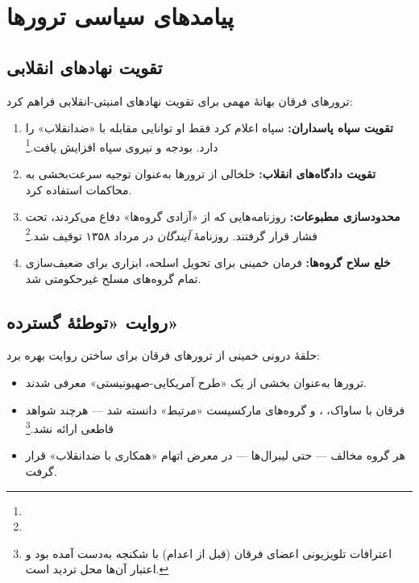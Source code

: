 \section{پیامدهای سیاسی ترورها}

\subsection{تقویت نهادهای انقلابی}

ترورهای فرقان بهانهٔ مهمی برای تقویت نهادهای امنیتی-انقلابی فراهم کرد:

\begin{enumerate}[label=\textcolor{cPrimary}{\bfseries\arabic*.}, rightmargin=2em]
    \item \textbf{تقویت سپاه پاسداران:} سپاه اعلام کرد فقط او توانایی مقابله با «ضدانقلاب» را دارد. بودجه و نیروی سپاه افزایش یافت.\footnote{}
    
    \item \textbf{تقویت دادگاه‌های انقلاب:} خلخالی از ترورها به‌عنوان توجیه سرعت‌بخشی به محاکمات استفاده کرد.
    
    \item \textbf{محدودسازی مطبوعات:} روزنامه‌هایی که از «آزادی گروه‌ها» دفاع می‌کردند، تحت فشار قرار گرفتند. روزنامهٔ \textit{آیندگان} در مرداد ۱۳۵۸ توقیف شد.\footnote{}
    
    \item \textbf{خلع سلاح گروه‌ها:} فرمان خمینی برای تحویل اسلحه، ابزاری برای ضعیف‌سازی تمام گروه‌های مسلح غیرحکومتی شد.
\end{enumerate}

\subsection{روایت «توطئهٔ گسترده»}

حلقهٔ درونی خمینی از ترورهای فرقان برای ساختن روایت  بهره برد:

\begin{itemize}[label=\textcolor{cConsolid}{$\blacktriangleright$}, rightmargin=2em]
    \item ترورها به‌عنوان بخشی از یک «طرح آمریکایی-صهیونیستی» معرفی شدند.
    \item فرقان با ساواک، ، و گروه‌های مارکسیست «مرتبط» دانسته شد — هرچند شواهد قاطعی ارائه نشد.\footnote{اعترافات تلویزیونی اعضای فرقان (قبل از اعدام) با شکنجه به‌دست آمده بود و اعتبار آن‌ها محل تردید است. }
    \item هر گروه مخالف — حتی لیبرال‌ها — در معرض اتهام «همکاری با ضدانقلاب» قرار گرفت.
\end{itemize}

